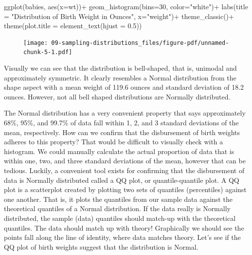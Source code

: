\documentclass[
  letterpaper,
  DIV=11,
  numbers=noendperiod]{scrreprt}
\newenvironment{Shaded}{\begin{snugshade}}{\end{snugshade}}
\newcommand{\AttributeTok}[1]{\textcolor[rgb]{0.40,0.45,0.13}{#1}}
\newcommand{\DecValTok}[1]{\textcolor[rgb]{0.68,0.00,0.00}{#1}}
\newcommand{\FloatTok}[1]{\textcolor[rgb]{0.68,0.00,0.00}{#1}}
\newcommand{\FunctionTok}[1]{\textcolor[rgb]{0.28,0.35,0.67}{#1}}
\newcommand{\NormalTok}[1]{\textcolor[rgb]{0.00,0.23,0.31}{#1}}
\newcommand{\SpecialCharTok}[1]{\textcolor[rgb]{0.37,0.37,0.37}{#1}}
\newcommand{\StringTok}[1]{\textcolor[rgb]{0.13,0.47,0.30}{#1}}
\theoremstyle{definition}
\theoremstyle{remark}
\begin{document}
\begin{Shaded}
\begin{Highlighting}[]
\FunctionTok{ggplot}\NormalTok{(babies, }\FunctionTok{aes}\NormalTok{(}\AttributeTok{x=}\NormalTok{wt))}\SpecialCharTok{+}
  \FunctionTok{geom\_histogram}\NormalTok{(}\AttributeTok{bins=}\DecValTok{30}\NormalTok{, }\AttributeTok{color=}\StringTok{"white"}\NormalTok{)}\SpecialCharTok{+}
  \FunctionTok{labs}\NormalTok{(}\AttributeTok{title =} \StringTok{"Distribution of Birth Weight in Ounces"}\NormalTok{, }\AttributeTok{x=}\StringTok{"weight"}\NormalTok{)}\SpecialCharTok{+}
  \FunctionTok{theme\_classic}\NormalTok{()}\SpecialCharTok{+}
  \FunctionTok{theme}\NormalTok{(}\AttributeTok{plot.title =} \FunctionTok{element\_text}\NormalTok{(}\AttributeTok{hjust =} \FloatTok{0.5}\NormalTok{))}
\end{Highlighting}
\end{Shaded}

\begin{figure}[H]

{\centering \texttt{[image: 09-sampling-distributions\_files/figure-pdf/unnamed-chunk-5-1.pdf]}

}

\end{figure}

Visually we can see that the distribution is bell-shaped, that is,
unimodal and approximately symmetric. It clearly resembles a Normal
distribution from the shape aspect with a mean weight of 119.6 ounces
and standard deviation of 18.2 ounces. However, not all bell shaped
distributions are Normally distributed.

The Normal distribution has a very convenient property that says
approximately 68\%, 95\%, and 99.7\% of data fall within 1, 2, and 3
standard deviations of the mean, respectively. How can we confirm that
the disbursement of birth weights adheres to this property? That would
be difficult to visually check with a histogram. We could manually
calculate the actual proportion of data that is within one, two, and
three standard deviations of the mean, however that can be tedious.
Luckily, a convenient tool exists for confirming that the disbursement
of data is Normally distributed called a QQ plot, or quantile-quantile
plot. A QQ plot is a scatterplot created by plotting two sets of
quantiles (percentiles) against one another. That is, it plots the
quantiles from our sample data against the theoretical quantiles of a
Normal distribution. If the data really is Normally distributed, the
sample (data) quantiles should match-up with the theoretical quantiles.
The data should match up with theory! Graphically we should see the
points fall along the line of identity, where data matches theory. Let's
see if the QQ plot of birth weights suggest that the distribution is
Normal.
\end{document}
